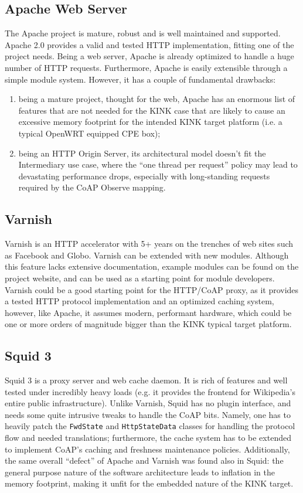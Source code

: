 \subsection{Apache Web Server}
The Apache project is mature, robust and is well maintained and supported. Apache 2.0 provides a valid and tested HTTP implementation, fitting one of the project needs.  Being a web server, Apache is already optimized to handle a huge number of HTTP requests.  Furthermore, Apache is easily extensible through a simple module system.  However, it has a couple of fundamental drawbacks:
\begin{enumerate}
\item being a mature project, thought for the web, Apache has an enormous list of features that are not needed for the KINK case that are likely to cause an excessive memory footprint for the intended KINK target platform (i.e. a typical OpenWRT equipped CPE box);
\item being an HTTP Origin Server, its architectural model doesn't fit the Intermediary use case, where the ``one thread per request'' policy may lead to devastating performance drops, especially with long-standing requests required by the CoAP Observe mapping.
\end{enumerate}

\subsection{Varnish}
Varnish is an HTTP accelerator with 5+ years on the trenches of web sites such as Facebook and Globo.  Varnish can be extended with new modules. Although this feature lacks extensive documentation, example modules can be found on the project website, and can be used as a starting point for module developers.
Varnish could be a good starting point for the HTTP/CoAP proxy, as it provides a tested HTTP protocol implementation and an optimized caching system, however, like Apache, it assumes modern, performant hardware, which could be one or more orders of magnitude bigger than the KINK typical target platform.

\subsection{Squid 3}
Squid 3 is a proxy server and web cache daemon.  It is rich of features and well tested under incredibly heavy loads (e.g. it provides the frontend for Wikipedia's entire public infrastructure).
Unlike Varnish, Squid has no plugin interface, and needs some quite intrusive tweaks to handle the CoAP bits.  Namely, one has to heavily patch the \texttt{FwdState} and \texttt{HttpStateData} classes for handling the protocol flow and needed translations; furthermore, the cache system has to be extended to implement CoAP's caching and freshness maintenance policies.
Additionally, the same overall ``defect'' of Apache and Varnish was found also in Squid: the general purpose nature of the software architecture leads to inflation in the memory footprint, making it unfit for the embedded nature of the KINK target.

